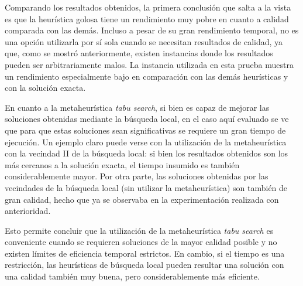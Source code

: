 Comparando los resultados obtenidos, la primera conclusión que salta a la
vista es que la heurística golosa tiene un rendimiento muy pobre en cuanto
a calidad comparada con las demás. Incluso a pesar de su gran rendimiento
temporal, no es una opción utilizarla por sí sola cuando se necesitan
resultados de calidad, ya que, como se mostró anteriormente, existen instancias
donde los resultados pueden ser arbitrariamente malos. La instancia utilizada
en esta prueba muestra un rendimiento especialmente bajo en comparación
con las demás heurísticas y con la solución exacta.

En cuanto a la metaheurística \emph{tabu search}, si bien es capaz de mejorar
las soluciones obtenidas mediante la búsqueda local, en el caso aquí evaluado
se ve que para que estas soluciones sean significativas se requiere un gran
tiempo de ejecución. Un ejemplo claro puede verse con la utilización de la
metaheurística con la vecindad II de la búsqueda local: si bien los resultados
obtenidos son los más cercanos a la solución exacta, el tiempo insumido es
también considerablemente mayor. Por otra parte, las soluciones obtenidas
por las vecindades de la búsqueda local (sin utilizar la metaheurística) son
también de gran calidad, hecho que ya se observaba en la experimentación
realizada con anterioridad.

Esto permite concluir que la utilización de la metaheurística \emph{tabu search}
es conveniente cuando se requieren soluciones de la mayor calidad posible y
no existen límites de eficiencia temporal estrictos. En cambio, si el tiempo
es una restricción, las heurísticas de búsqueda local pueden resultar una
solución con una calidad también muy buena, pero considerablemente más
eficiente.
